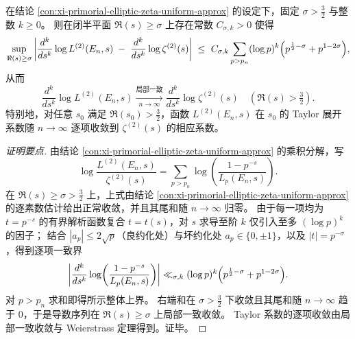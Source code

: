 \begin{conclusion}\label{con:xi-primorial-higher-analytic-stability}
在结论 \ref{con:xi-primorial-elliptic-zeta-uniform-approx} 的设定下，固定 \(\sigma>\tfrac32\) 与整数 \(k\ge 0\)。
则在闭半平面 \(\Re(s)\ge\sigma\) 上存在常数 \(C_{\sigma,k}>0\) 使得
\[
\sup_{\Re(s)\ge\sigma}\left|
\frac{d^k}{ds^k}\log L^{(2)}(E_n,s)
\;-\;
\frac{d^k}{ds^k}\log \zeta^{(2)}(s)
\right|
\ \le\
C_{\sigma,k}\sum_{p>p_n}(\log p)^k\Bigl(p^{\frac12-\sigma}+p^{1-2\sigma}\Bigr),
\]
从而
\[
\frac{d^k}{ds^k}\log L^{(2)}(E_n,s)\xrightarrow[n\to\infty]{\text{局部一致}}
\frac{d^k}{ds^k}\log \zeta^{(2)}(s)
\quad(\Re(s)>\tfrac32).
\]
特别地，对任意 \(s_0\) 满足 \(\Re(s_0)>\tfrac32\)，函数 \(L^{(2)}(E_n,s)\) 在 \(s_0\) 的 Taylor 展开系数随 \(n\to\infty\) 逐项收敛到 \(\zeta^{(2)}(s)\) 的相应系数。
\end{conclusion}
\begin{proof}[证明要点]
由结论 \ref{con:xi-primorial-elliptic-zeta-uniform-approx} 的乘积分解，写
\[
\log\frac{L^{(2)}(E_n,s)}{\zeta^{(2)}(s)}
=\sum_{p>p_n}\log\!\left(\frac{1-p^{-s}}{L_p(E_n,s)}\right).
\]
在 \(\Re(s)\ge\sigma>\tfrac32\) 上，上式由结论 \ref{con:xi-primorial-elliptic-zeta-uniform-approx} 的逐素数估计给出正常收敛，并且其尾和随 \(n\to\infty\) 归零。
由于每一项均为 \(t=p^{-s}\) 的有界解析函数复合 \(t=t(s)\)，对 \(s\) 求导至阶 \(k\) 仅引入至多 \((\log p)^k\) 的因子；
结合 \(|a_p|\le 2\sqrt p\)（良约化处）与坏约化处 \(a_p\in\{0,\pm1\}\)，以及 \(|t|=p^{-\sigma}\)，得到逐项一致界
\[
\left|\frac{d^k}{ds^k}\log\!\left(\frac{1-p^{-s}}{L_p(E_n,s)}\right)\right|
\ll_{\sigma,k}(\log p)^k\Bigl(p^{\frac12-\sigma}+p^{1-2\sigma}\Bigr).
\]
对 \(p>p_n\) 求和即得所示整体上界。
右端和在 \(\sigma>\tfrac32\) 下收敛且其尾和随 \(n\to\infty\) 趋于 \(0\)，于是导数序列在 \(\Re(s)\ge\sigma\) 上局部一致收敛。
Taylor 系数的逐项收敛由局部一致收敛与 Weierstrass 定理得到。证毕。
\end{proof}

\endinput

